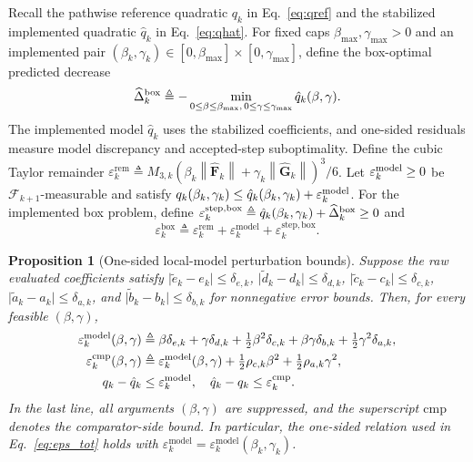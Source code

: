 \documentclass{article}
\newtheorem{proposition}{Proposition}
\theoremstyle{remark}
\newcommand{\norm}[1]{\left\lVert #1\right\rVert}
\newcommand{\hatF}{\widehat{\boldsymbol{F}}}
\newcommand{\hatG}{\widehat{\boldsymbol{G}}}
\begin{document}
Recall the pathwise reference quadratic $q_k$ in Eq.~\eqref{eq:qref} and the stabilized implemented quadratic $\hat q_k$ in Eq.~\eqref{eq:qhat}.
For fixed caps $\beta_{\max},\gamma_{\max}>0$ and an implemented pair $(\beta_k,\gamma_k)\in[0,\beta_{\max}]\times[0,\gamma_{\max}]$, define the box-optimal predicted decrease
\[
\widehat\Delta_k^{\rm box}
\triangleq
-\min_{0\le\beta\le\beta_{\max},\,0\le\gamma\le\gamma_{\max}}
\hat q_k(\beta,\gamma).
\]
The implemented model $\hat q_k$ uses the stabilized coefficients, and one-sided residuals measure model discrepancy and accepted-step suboptimality.
Define the cubic Taylor remainder $\varepsilon_{k}^{\mathrm{rem}}\triangleq M_{3,k} (\beta_{k}\norm{\hatF_{k}}+\gamma_{k}\norm{\hatG_{k}})^{3}/6$.
Let $\varepsilon_k^{\rm model}\ge0$ be $\mathscr F_{k+1}$-measurable and satisfy $q_k(\beta_k,\gamma_k)\le\hat q_k(\beta_k,\gamma_k) +\varepsilon_k^{\rm model}$.
For the implemented box problem, define $\varepsilon_k^{\rm step,box}\triangleq\hat q_k(\beta_k,\gamma_k)+\widehat\Delta_k^{\rm box}\ge0$ and
\begin{equation}\label{eq:eps_tot}
\varepsilon_{k}^{\mathrm{box}}
\triangleq
\varepsilon_{k}^{\mathrm{rem}}+\varepsilon_{k}^{\mathrm{model}}
+\varepsilon_{k}^{\mathrm{step,box}}.
\end{equation}

\begin{proposition}[One-sided local-model perturbation bounds]\label{prop:model_approx}
Suppose the raw evaluated coefficients satisfy $\lvert\tilde e_{k}-e_{k}\rvert\le\delta_{e,k}$, $\lvert\tilde d_{k}-d_{k}\rvert\le\delta_{d,k}$, $\lvert\tilde c_{k}-c_{k}\rvert\le\delta_{c,k}$, $\lvert\tilde a_{k}-a_{k}\rvert\le\delta_{a,k}$, and $\lvert\tilde b_{k}-b_{k}\rvert\le\delta_{b,k}$ for nonnegative error bounds.
Then, for every feasible $(\beta,\gamma)$,
\begin{equation}\label{eq:eps_model_bound}
\begin{aligned}
\varepsilon_k^{\rm model}(\beta,\gamma)
&\triangleq\beta\delta_{e,k}+\gamma\delta_{d,k}
+\tfrac12\beta^2\delta_{c,k}+\beta\gamma\delta_{b,k}
+\tfrac12\gamma^2\delta_{a,k},\\
\varepsilon_k^{\rm cmp}(\beta,\gamma)
&\triangleq\varepsilon_k^{\rm model}(\beta,\gamma)
+\tfrac12\rho_{c,k}\beta^2+\tfrac12\rho_{a,k}\gamma^2,\\
q_k-\hat q_k&\le\varepsilon_k^{\rm model},
\quad \hat q_k-q_k\le\varepsilon_k^{\rm cmp}.
\end{aligned}
\end{equation}
In the last line, all arguments $(\beta,\gamma)$ are suppressed, and the superscript $\mathrm{cmp}$ denotes the comparator-side bound.
In particular, the one-sided relation used in Eq.~\eqref{eq:eps_tot} holds with $\varepsilon_k^{\mathrm{model}}=\varepsilon_k^{\mathrm{model}}(\beta_k,\gamma_k)$.
\end{proposition}
\end{document}
